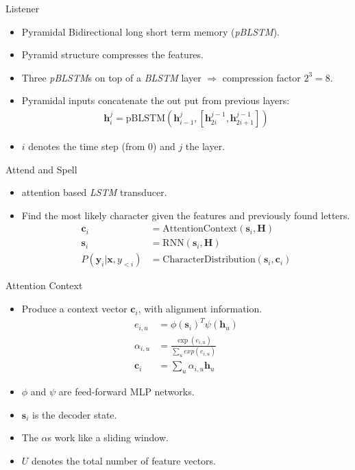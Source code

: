 \documentclass{beamer}
\begin{document}
\begin{frame}{Listener}
\begin{itemize}
	\item Pyramidal Bidirectional long short term memory (\textit{pBLSTM}).
	\item Pyramid structure compresses the features. 
	\item Three \textit{pBLSTM}s on top of a \textit{BLSTM} layer $\Rightarrow$ compression factor $2^3 = 8 $.
	\item Pyramidal inputs concatenate the out put from previous layers:
		  \begin{align}
		  	\mathbf{h}_i^j = \text{pBLSTM}(\mathbf{h}_{i-1}^j, [\mathbf{h}_{2i}^{j-1}, \mathbf{h}_{2i+1}^{j-1}])
		  \end{align}
	\item $i$ denotes the time step (from $0$) and $j$ the layer.
\end{itemize}
\end{frame}

\begin{frame}{Attend and Spell}
\begin{itemize}
	\item attention based \textit{LSTM} transducer.
	\item Find the most likely character given the features and previously found letters.
		  \begin{align}
			\mathbf{c}_i &= \text{AttentionContext}(\mathbf{s}_i,\mathbf{H}) \\
			\mathbf{s}_i &= \text{RNN}(\mathbf{s}_i,\mathbf{H}) \\
			P(\mathbf{y}_i|\mathbf{x},y_{<i}) &= \text{CharacterDistribution}(\mathbf{s}_i,\mathbf{c}_{i})
		  \end{align}

\end{itemize}
\end{frame}
\begin{frame}{Attention Context}
	\begin{itemize}
		\item Produce a context vector $\mathbf{c}_i$, with alignment information.
			  \begin{align}
			  	e_{i,u} &= \phi(\mathbf{s}_i)^T \psi(\mathbf{h}_u) \\
			  	\alpha_{i,u} &= \frac{\exp(e_{i,u})}{\sum_u exp(e_{i,u})} \\
			  	\mathbf{c}_i &= \sum\limits_{u} \alpha_{i,u}\mathbf{h}_u 
			  \end{align}
		\item $\phi$ and $\psi$ are feed-forward MLP networks.
		\item $\mathbf{s}_i$ is the decoder state.
		\item The $\alpha$s work like a sliding window.
		\item $U$ denotes the total number of feature vectors.
	\end{itemize}
\end{frame}
\end{document}
